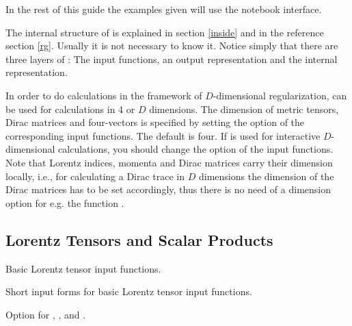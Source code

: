 In the rest of this guide the examples given will use the notebook interface.

The internal structure of \fc
is explained in section \ref{inside} and in the
reference section \ref{rg}. Usually it is not necessary to know it.
Notice simply that there are three layers of \fc: The input functions,
an output representation and the internal representation.

In order to do calculations in the framework of $D$-dimensional
regularization, \fc can be used for  calculations
in 4 or $D$
dimensions.
The dimension of  metric tensors, Dirac matrices and  four-vectors
is specified by setting the option  of the corresponding
input functions.
The default is four. If \fc is  used for interactive
$D$-dimensional calculations, you should change the option of the
input functions. 
Note that Lorentz indices, momenta and
Dirac matrices carry their dimension
locally, i.e., for calculating a Dirac trace in $D$ dimensions the
dimension of the Dirac matrices has to be set accordingly, thus
there is no need of a dimension option for e.g. the function .

\subsection{Lorentz Tensors and Scalar Products}

 {Basic Lorentz tensor input functions.}

 {Short input forms for basic Lorentz tensor input functions.}

 {Option for , ,  and  .}

